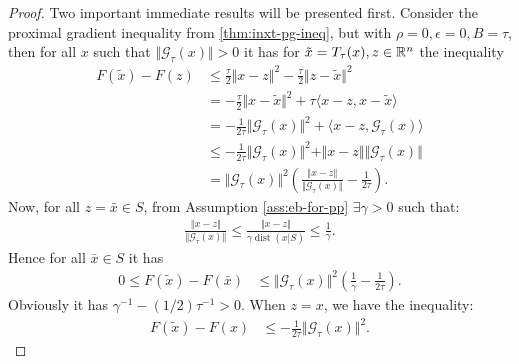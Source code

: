 \documentclass[12pt]{article}
\DeclareMathOperator{\dist}{\mathop{dist}}
\begin{document}
        \begin{proof}
            Two important immediate results will be presented first.
            Consider the proximal gradient inequality from \ref{thm:inxt-pg-ineq}, but with $\rho = 0, \epsilon = 0, B = \tau$, then for all $x$ such that $\Vert \mathcal G_\tau(x)\Vert > 0$ it has for $\tilde x = T_{\tau}(x), z \in \mathbb R^n$ the inequality 
            \begin{align*}
                F(\tilde x) - F(z) 
                &\le 
                \frac{\tau}{2}\Vert x - z\Vert^2 - \frac{\tau}{2}\Vert z - \tilde x\Vert^2
                \\
                &=  
                - \frac{\tau}{2}\Vert x - \tilde x\Vert^2
                + \tau\langle x - z, x - \tilde x\rangle
                \\
                &=  - \frac{1}{2\tau}\Vert \mathcal G_\tau(x) \Vert^2
                + \langle x - z, \mathcal G_\tau(x)\rangle
                \\
                &\le  - \frac{1}{2\tau}\Vert \mathcal G_\tau(x)\Vert^2 
                + \Vert x - z\Vert \Vert \mathcal G_\tau(x)\Vert
                \\
                &=
                \Vert \mathcal G_\tau(x)\Vert^2\left(
                    \frac{\Vert x - z \Vert}{\Vert \mathcal G_\tau(x)\Vert} - \frac{1}{2\tau}
                \right). 
            \end{align*}
            Now, for all $z = \bar x \in S$, from Assumption \ref{ass:eb-for-pp} $\exists \gamma > 0$ such that: 
            \begin{align*}
                \frac{\Vert x - z \Vert}{\Vert \mathcal G_\tau(x)\Vert}
                \le 
                \frac{\Vert x - z \Vert}{\gamma \dist(x | S)} \le \frac{1}{\gamma}. 
            \end{align*}
            Hence for all $\bar x \in S$ it has 
            \begin{align}\label{ineq:lin-cnvg-ista-eb-pitem1}
                0\le F(\tilde x) - F(\bar x)&\le 
                \Vert \mathcal G_\tau(x)\Vert^2\left(
                    \frac{1}{\gamma} - \frac{1}{2\tau}
                \right). 
            \end{align}
            Obviously it has $\gamma^{-1} - (1/2)\tau^{-1} > 0$. 
            When $z = x$, we have the inequality: 
            \begin{align}\label{ineq:lin-cnvg-ista-eb-pitem2}
                F(\tilde x) - F(x) &\le - \frac{1}{2\tau}\Vert \mathcal G_\tau(x)\Vert^2. 

\end{align}
\end{proof}
\end{document}
